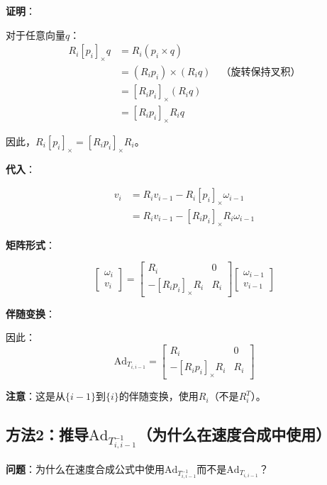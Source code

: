 \documentclass[12pt,a4paper]{article}
\begin{document}
\textbf{证明}：

对于任意向量$q$：
\begin{align}
R_i [p_i]_{\times} q &= R_i (p_i \times q) \\
&= (R_i p_i) \times (R_i q) \quad \text{（旋转保持叉积）} \\
&= [R_i p_i]_{\times} (R_i q) \\
&= [R_i p_i]_{\times} R_i q
\end{align}

因此，$R_i [p_i]_{\times} = [R_i p_i]_{\times} R_i$。

\textbf{代入}：

\begin{align}
v_i &= R_i v_{i-1} - R_i [p_i]_{\times} \omega_{i-1} \\
&= R_i v_{i-1} - [R_i p_i]_{\times} R_i \omega_{i-1}
\end{align}

\textbf{矩阵形式}：

\begin{equation}
\begin{bmatrix} \omega_i \\ v_i \end{bmatrix} = \begin{bmatrix}
R_i & 0 \\
-[R_i p_i]_{\times} R_i & R_i
\end{bmatrix} \begin{bmatrix} \omega_{i-1} \\ v_{i-1} \end{bmatrix}
\end{equation}

\textbf{伴随变换}：

因此：
\begin{equation}
\text{Ad}_{T_{i,i-1}} = \begin{bmatrix}
R_i & 0 \\
-[R_i p_i]_{\times} R_i & R_i
\end{bmatrix}
\end{equation}

\textbf{注意}：这是从$\{i-1\}$到$\{i\}$的伴随变换，使用$R_i$（不是$R_i^T$）。

\subsection{方法2：推导$\text{Ad}_{T_{i,i-1}^{-1}}$（为什么在速度合成中使用）}

\textbf{问题}：为什么在速度合成公式中使用$\text{Ad}_{T_{i,i-1}^{-1}}$而不是$\text{Ad}_{T_{i,i-1}}$？
\end{document}
